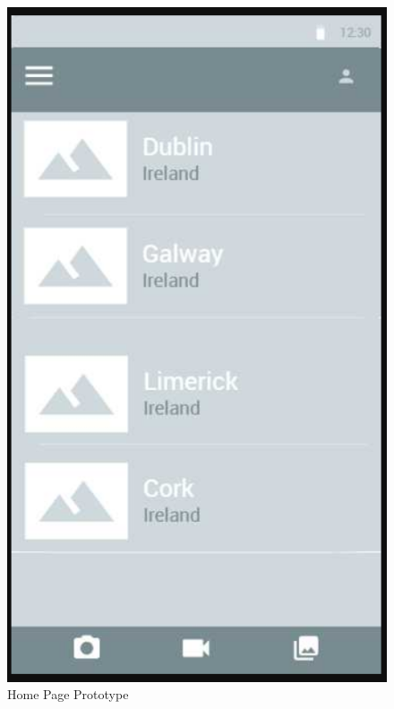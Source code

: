 \begin{figure}[h!]
\begin{minipage}[t]{0.48\textwidth}
\includegraphics[width=\linewidth,keepaspectratio=true]{img/home_page_mock.PNG}
\caption{Home Page Prototype}
\label{fig:Home Page Prototype}
\end{minipage}
\end{figure}